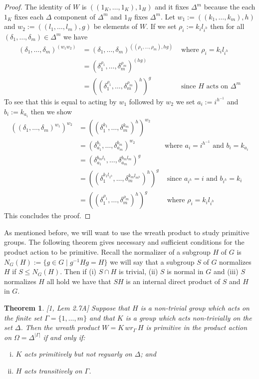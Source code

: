 \documentclass[]{article}
\newtheorem{thm}{Theorem}[section]
\theoremstyle{definition}
\begin{document}
\begin{proof}
	The identity of $W$ is $((1_K,\dots,1_K),1_H)$ and it fixes $\Delta^m$ because the each $1_K$ fixes each $\Delta$ component of $\Delta^m$ and $1_H$ fixes $\Delta^m$. Let $w_1:=((k_1,\dots,k_m),h)$ and $w_2:=((l_1,\dots,l_m),g)$ be elements of $W$. If we set $\rho_i := k_il_{i^h}$ then for all $(\delta_1,\dots,\delta_m) \in \Delta^m$ we have
	\begin{align*}
		(\delta_1,\dots,\delta_m)^{(w_1w_2)} & = (\delta_1,\dots,\delta_m)^{((\rho_1,\dots,\rho_m),hg)} & \mbox{ where } \rho_i = k_il_{i^h}
		\\ & = (\delta_1^{\rho_1},\dots,\delta^{\rho_m}_m)^{(hg)} & 
		\\ & = ((\delta_1^{\rho_1},\dots,\delta^{\rho_m}_m)^h)^g & \mbox{ since } H \mbox{ acts on } \Delta^m
	\end{align*}
	To see that this is equal to acting by $w_1$ followed by $w_2$ we set $a_i:=i^{h^{-1}}$ and $b_i:=k_{a_i}$ then we show
	\begin{align*}
		((\delta_1,\dots,\delta_m)^{w_1})^{w_2} & = ((\delta^{k_1}_1,\dots,\delta^{k_m}_m)^h)^{w_2} &\\
		& = (\delta^{b_1}_{a_1},\dots,\delta^{b_m}_{a_m})^{w_2} & \mbox{where } a_i=i^{h^{-1}} \mbox{ and } b_i=k_{a_i} \\
		& = (\delta^{b_ml_1}_{a_1},\dots,\delta^{b_ml_m}_{a_m})^g & \\
		& = ((\delta^{k_1l_{1^h}}_1,\dots,\delta^{k_ml_{m^h}}_m)^h)^g & \mbox{ since } a_{i^h}=i \mbox{ and } b_{i^h}=k_i \\
		& = ((\delta_1^{\rho_1},\dots,\delta^{\rho_m}_m)^h)^g & \mbox{ where } \rho_i = k_il_{i^h}
	\end{align*}
	This concludes the proof.
\end{proof}	
	
	As mentioned before, we will want to use the wreath product to study primitive groups. The following theorem gives necessary and sufficient conditions for the product action to be primitive. Recall the normalizer of a subgroup $H$ of $G$ is $N_G(H):=\{g \in G \; | \; g^{-1}Hg = H \}$ we will say that a subgroup $S$ of $G$ normalizes $H$ if $S \leqslant N_G(H)$. Then if (i) $S \cap H$ is trivial, (ii) $S$ is normal in $G$ and (iii) $S$ normalizes $H$ all hold we have that $SH$ is an internal direct product of $S$ and $H$ in $G$.
	
\begin{thm} \label{thm:prodaction} \emph{[1, Lem 2.7A]}
	Suppose that $H$ is a non-trivial group which acts on the finite set $\Gamma=\{1,\dots,m \}$ and that $K$ is a group which acts non-trivially on the set $\Delta$. Then the wreath product $W = K \, wr_\Gamma \, H$ is primitive in the product action on $\Omega = \Delta^{|\Gamma|}$ if and only if:
	\begin{enumerate}[(i)]
		\item $K$ acts primitively but not reguarly on $\Delta$; and
\vspace{-0.2cm}	\item $H$ acts transitively on $\Gamma$.
	\end{enumerate}
\end{thm}	
\end{document}
